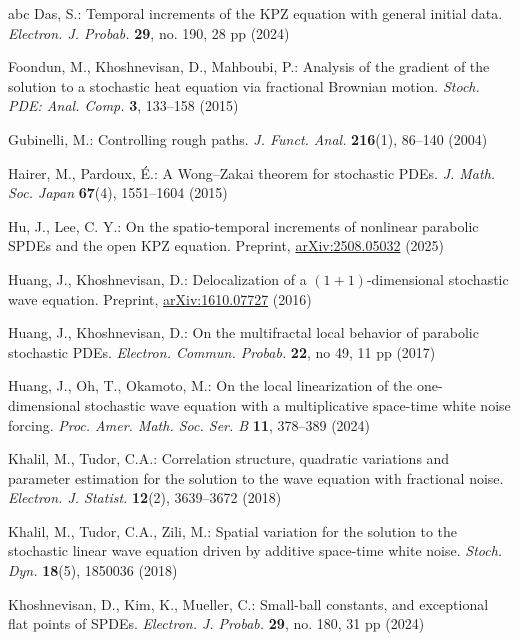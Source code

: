 \documentclass[11pt,reqno]{amsart}
\numberwithin{equation}{section}
\newcommand{\1}{{\bf 1}}
\newcommand{\2}{{\bf 2}}
\begin{document}
\begin{thebibliography}{abc}
Das, S.: Temporal increments of the KPZ equation with general initial data. 
\textit{Electron. J. Probab.} \textbf{29},  no. 190, 28 pp (2024)

  
Foondun, M., Khoshnevisan, D., Mahboubi, P.: Analysis of the gradient of the solution to a stochastic heat equation via fractional Brownian motion. 
\textit{Stoch. PDE: Anal. Comp.} \textbf{3}, 133--158 (2015)
 

Gubinelli, M.: Controlling rough paths. \textit{J. Funct. Anal.} \textbf{216}(1), 86--140 (2004)

Hairer, M., Pardoux, \'E.: A Wong–Zakai theorem for stochastic PDEs. \textit{J. Math. Soc. Japan} \textbf{67}(4), 1551--1604 (2015)
 
 

Hu, J., Lee, C. Y.: On the spatio-temporal increments of nonlinear parabolic SPDEs and the open KPZ equation. 
Preprint, \href{https://arxiv.org/pdf/2508.05032}{arXiv:2508.05032} (2025)


Huang, J., Khoshnevisan, D.: Delocalization of a $(1+1)$-dimensional stochastic wave equation. 
Preprint, \href{https://arxiv.org/abs/1610.07727}{arXiv:1610.07727} (2016)

Huang, J., Khoshnevisan, D.: On the multifractal local behavior of parabolic stochastic PDEs. 
\textit{Electron. Commun. Probab.} \textbf{22}, no 49, 11 pp (2017)

Huang, J., Oh, T., Okamoto, M.: On the local linearization of the one-dimensional stochastic wave equation with a multiplicative space-time white noise forcing. 
\textit{Proc. Amer. Math. Soc. Ser. B} \textbf{11}, 378--389 (2024)

 

 
Khalil, M., Tudor, C.A.: Correlation structure, quadratic variations and parameter estimation for the solution to the wave equation with fractional noise. 
\textit{Electron. J. Statist.} \textbf{12}(2), 3639--3672 (2018)

Khalil, M., Tudor, C.A., Zili, M.: Spatial variation for the solution to the stochastic linear wave equation driven by additive space-time white noise.  \textit{Stoch. Dyn.} \textbf{18}(5), 1850036 (2018)

 


Khoshnevisan, D., Kim, K., Mueller, C.: Small-ball constants, and exceptional flat points of SPDEs. 
\textit{Electron. J. Probab.} \textbf{29}, no. 180, 31 pp (2024)
  

\end{thebibliography}
\end{document}
